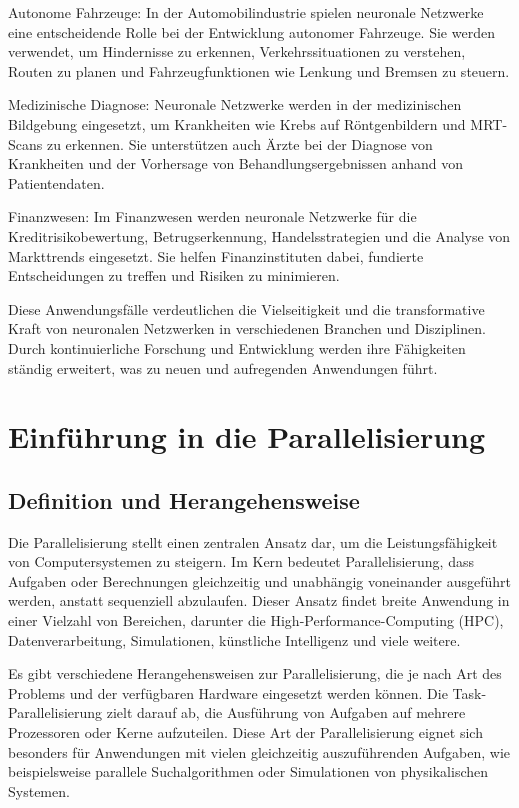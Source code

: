Autonome Fahrzeuge: In der Automobilindustrie spielen neuronale Netzwerke eine entscheidende Rolle bei der Entwicklung autonomer Fahrzeuge. Sie werden verwendet, um Hindernisse zu erkennen, Verkehrssituationen zu verstehen, Routen zu planen und Fahrzeugfunktionen wie Lenkung und Bremsen zu steuern.

Medizinische Diagnose: Neuronale Netzwerke werden in der medizinischen Bildgebung eingesetzt, um Krankheiten wie Krebs auf Röntgenbildern und MRT-Scans zu erkennen. Sie unterstützen auch Ärzte bei der Diagnose von Krankheiten und der Vorhersage von Behandlungsergebnissen anhand von Patientendaten.

Finanzwesen: Im Finanzwesen werden neuronale Netzwerke für die Kreditrisikobewertung, Betrugserkennung, Handelsstrategien und die Analyse von Markttrends eingesetzt. Sie helfen Finanzinstituten dabei, fundierte Entscheidungen zu treffen und Risiken zu minimieren.

Diese Anwendungsfälle verdeutlichen die Vielseitigkeit und die transformative Kraft von neuronalen Netzwerken in verschiedenen Branchen und Disziplinen. Durch kontinuierliche Forschung und Entwicklung werden ihre Fähigkeiten ständig erweitert, was zu neuen und aufregenden Anwendungen führt.

\section{Einführung in die Parallelisierung}
\label{sec:Grundlagen_Parallelisierung}
\subsection{Definition und Herangehensweise}
\label{sec:Grundlagen_Parallelisierung_Herangehensweise}
Die Parallelisierung stellt einen zentralen Ansatz dar, um die Leistungsfähigkeit von Computersystemen zu steigern. Im Kern bedeutet Parallelisierung, dass Aufgaben oder Berechnungen gleichzeitig und unabhängig voneinander ausgeführt werden, anstatt sequenziell abzulaufen. Dieser Ansatz findet breite Anwendung in einer Vielzahl von Bereichen, darunter die High-Performance-Computing (HPC), Datenverarbeitung, Simulationen, künstliche Intelligenz und viele weitere.

Es gibt verschiedene Herangehensweisen zur Parallelisierung, die je nach Art des Problems und der verfügbaren Hardware eingesetzt werden können. Die Task-Parallelisierung zielt darauf ab, die Ausführung von Aufgaben auf mehrere Prozessoren oder Kerne aufzuteilen. Diese Art der Parallelisierung eignet sich besonders für Anwendungen mit vielen gleichzeitig auszuführenden Aufgaben, wie beispielsweise parallele Suchalgorithmen oder Simulationen von physikalischen Systemen.

